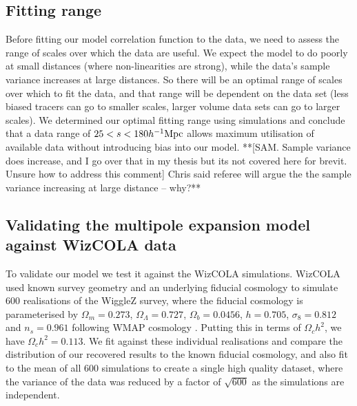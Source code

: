 \documentclass[iop,twocolappendix]{emulateapj}
\newcommand{\red}{\color{red}}
\newcommand{\hMpc}{h^{-1} {\rm Mpc}} %
\begin{document}
\subsection{Fitting range} \label{sec:trunc}
Before fitting our model correlation function to the data, we need to assess the range of scales over which the data are useful.  We expect the model to do poorly at small distances (where non-linearities are strong), while the data's sample variance increases at large distances.  So there will be an optimal range of scales over which to fit the data, and that range will be dependent on the data set (less biased tracers can go to smaller scales, larger volume data sets can go to larger scales).  We determined our optimal fitting range using simulations \citep[see][]{HintonThesis2015}  and conclude that a data range of $25 < s < 180 \hMpc$ allows maximum utilisation of available data without introducing bias into our model. 
{\red **[SAM. Sample variance does increase, and I go over that in my thesis but its not covered here for brevit. Unsure how to address this comment] Chris said referee will argue the the sample variance increasing at large distance -- why?**}




\subsection{Validating the multipole expansion model against WizCOLA data}

 To validate our model we test it against the WizCOLA simulations.  WizCOLA used known survey geometry and an underlying fiducial cosmology to simulate 600 realisations of the WiggleZ survey, where the fiducial cosmology is parameterised by $\Omega_m = 0.273$, $\Omega_\Lambda = 0.727$, $\Omega_b = 0.0456$, $h=0.705$, $\sigma_8 = 0.812$ and $n_s = 0.961$ following WMAP cosmology \citep{Komatsu2009}.  Putting this in terms of $\Omega_c h^2$, we have $\Omega_c h^2 = 0.113$. We fit against these individual realisations and compare the distribution of our recovered results to the known fiducial cosmology, and also fit to the mean of all 600 simulations to create a single high quality dataset, where the variance of the data was reduced by a factor of $\sqrt{600}$ as the simulations are independent. 

\end{document}
